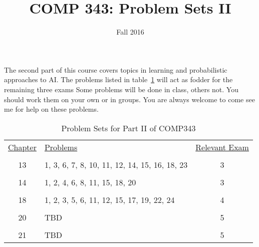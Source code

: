 \documentclass[nobib]{tufte-handout}
\title{COMP 343: Problem Sets II}
\author{  }
\date{Fall 2016}
\begin{document}
\maketitle

The second part of this course covers topics in learning and probabilistic approaches to AI\@.  The problems listed in table~\ref{probs} will act as fodder for the remaining three exams  Some problems will be done in class, others not. You should work them on your own or in groups. You are always welcome to come see me for help on these problems.

\begin{table}[!ht]
\begin{center}
\begin{tabular}{clc}
  \underline{Chapter} & \underline{Problems} & \underline{Relevant Exam} \\ \\
   13 & 1, 3, 6, 7, 8, 10, 11, 12, 14, 15, 16, 18, 23 & 3 \\ \\
   14 & 1, 2, 4, 6, 8, 11, 15, 18, 20 & 3 \\ \\
   18 & 1, 2, 3, 5, 6, 11, 12, 15, 17, 19, 22, 24 & 4 \\ \\
   20 & TBD & 5 \\ \\
   21 & TBD & 5
\end{tabular}
\end{center}
\caption{Problem Sets for Part II of COMP343}
\label{probs}
\end{table}
\end{document}
